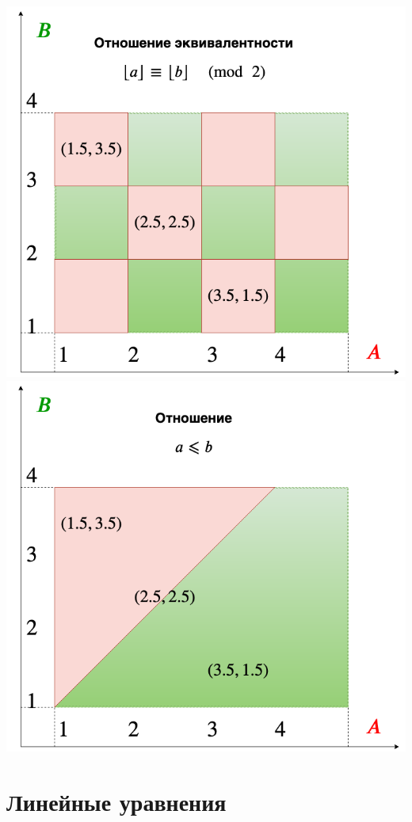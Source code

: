 \begin{center}
\includegraphics[scale=0.25]{equiv.png}
\includegraphics[scale=0.25]{lessthan.png}
\end{center}



\chapter{Линейные уравнения}

